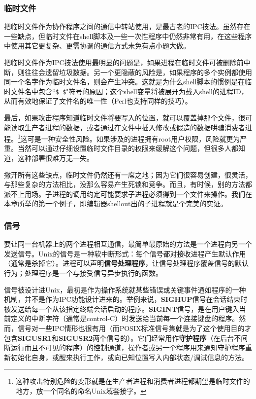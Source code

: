 \documentclass[12pt,oneside]{book}
\begin{document}
\subsubsection{临时文件}
把临时文件作为协作程序之间的通信中转站使用，是最古老的IPC技法。虽然存在一些缺点，但临时文件在shell脚本及一些一次性程序中仍然非常有用，在这些程序中使用其它更复杂、更需协调的通信方式未免有点小题大做。

把临时文件作为IPC技法使用最明显的问题是，如果进程在临时文件可被删除前中断，则往往会遗留垃圾数据。另一个更隐蔽的风险是，如果程序的多个实例都使用同一个名字作为临时文件名，则会产生冲突。这就是为什么shell脚本的惯例是在临时文件名中包含“\verb+$ $+"符号的原因；这个shell变量将被展开为载入shell的进程ID，从而有效地保证了文件名的唯一性（Perl也支持同样的技巧）。

最后，如果攻击程序知道临时文件将要写入的位置，就可以覆盖掉那个文件，很可能读取生产者进程的数据，或者通过在文件中插入修改或假造的数据哄骗消费者进程。\footnote{这种攻击特别危险的变形就是在生产者进程和消费者进程都期望是临时文件的地方，放一个同名的命名Unix域套接字。}这可是一种安全性风险。如果涉及的进程拥有root用户权限，风险就更为严重。当然可以通过仔细设置临时文件目录的权限来缓解这个问题，但很多人都知道，这种部署很难万无一失。

撇开所有这些缺点，临时文件仍然还有一席之地；因为它们很容易创建，很灵活，与那些复杂的方法相比，没那么容易产生死锁和竞争。而且，有时候，别的方法都派不上用场。子进程的调用约定可能要求子进程必须得到一个文件来操作。我们在本章所举的第一个例子，即编辑器shellout出的子进程就是个完美的实证。


\subsubsection{信号}
要让同一台机器上的两个进程相互通信，最简单最原始的方法是一个进程向另一个发送信号。Unix的信号是一种软中断形式：每个信号都对接收进程产生默认作用（通常是杀掉它）。进程可以声明\textbf{信号处理程序}，让信号处理程序覆盖信号的默认行为；处理程序是一个与接受信号异步执行的函数。

信号被设计进Unix，最初是作为操作系统就某些错误或关键事件通如程序的一种机制，并不是作为IPC功能设计进来的。举例来说，\textbf{SIGHUP}信号在会话结束时被发送给每一个从该指定终端会话启动的程序。\textbf{SIGINT}信号，是在用户键入当前定义的中断字符（通常是control-C）时发送给当前每一个连接键盘的程序。然而，信号对一些IPC情形也很有用（而POSIX标准信号集就是为了这个使用目的才包含\textbf{SIGUSR1}和\textbf{SIGUSR2}两个信号的）。它们经常用作\textbf{守护程序}（在后台不间断运行而且不可见的程序）的控制通道，操作者或另一个程序用来通知守护程序重新初始化自身，或醒来执行工作，或向已知位置写入内部状态/调试信息的方法。
\end{document}
